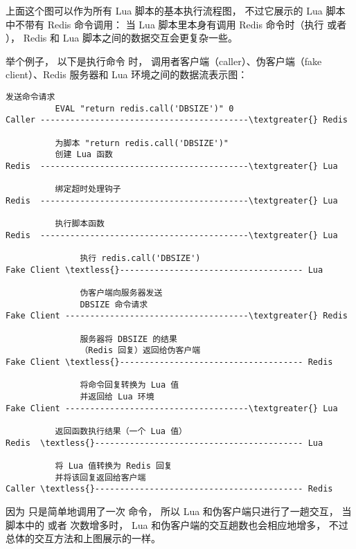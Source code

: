 \documentclass[a4paper,11pt,english]{sphinxmanual}
\begin{document}
上面这个图可以作为所有 Lua 脚本的基本执行流程图，
不过它展示的 Lua 脚本中不带有 Redis 命令调用：
当 Lua 脚本里本身有调用 Redis 命令时（执行  或者  ），
Redis 和 Lua 脚本之间的数据交互会更复杂一些。

举个例子，
以下是执行命令  时，
调用者客户端（caller）、伪客户端（fake client）、Redis 服务器和 Lua 环境之间的数据流表示图：

\begin{Verbatim}[commandchars=\\\{\}]
          发送命令请求
          EVAL "return redis.call('DBSIZE')" 0
Caller ------------------------------------------\textgreater{} Redis

          为脚本 "return redis.call('DBSIZE')"
          创建 Lua 函数
Redis  ------------------------------------------\textgreater{} Lua

          绑定超时处理钩子
Redis  ------------------------------------------\textgreater{} Lua

          执行脚本函数
Redis  ------------------------------------------\textgreater{} Lua

               执行 redis.call('DBSIZE')
Fake Client \textless{}------------------------------------- Lua

               伪客户端向服务器发送
               DBSIZE 命令请求
Fake Client -------------------------------------\textgreater{} Redis

               服务器将 DBSIZE 的结果
               （Redis 回复）返回给伪客户端
Fake Client \textless{}------------------------------------- Redis

               将命令回复转换为 Lua 值
               并返回给 Lua 环境
Fake Client -------------------------------------\textgreater{} Lua

          返回函数执行结果（一个 Lua 值）
Redis  \textless{}------------------------------------------ Lua

          将 Lua 值转换为 Redis 回复
          并将该回复返回给客户端
Caller \textless{}------------------------------------------ Redis
\end{Verbatim}

因为  只是简单地调用了一次  命令，
所以 Lua 和伪客户端只进行了一趟交互，
当脚本中的  或者  次数增多时，
Lua 和伪客户端的交互趟数也会相应地增多，
不过总体的交互方法和上图展示的一样。
\end{document}
